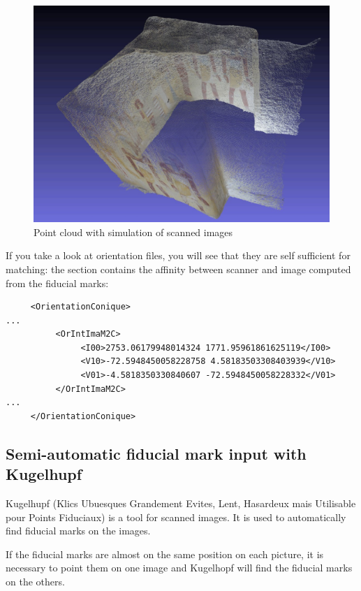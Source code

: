 \begin{figure}
   \includegraphics[width=120mm]{FIGS/Niche/snapshot00.jpg}
\caption{Point cloud with simulation of scanned images}
\label{ImNiche}
\end{figure}


If you take a look at orientation files, you will see that they are self sufficient for
matching: the {\tt <OrIntImaM2C>}  section contains the affinity between scanner and image computed
from the fiducial marks:

\begin{verbatim}
     <OrientationConique>
...
          <OrIntImaM2C>
               <I00>2753.06179948014324 1771.95961861625119</I00>
               <V10>-72.5948450058228758 4.58183503308403939</V10>
               <V01>-4.5818350330840607 -72.5948450058228332</V01>
          </OrIntImaM2C>
...
     </OrientationConique>
\end{verbatim}



\subsection{Semi-automatic fiducial mark input with Kugelhupf}

Kugelhupf (Klics Ubuesques Grandement Evites, Lent, Hasardeux mais Utilisable pour Points Fiduciaux) is a tool for scanned images. It is used to automatically find fiducial marks on the images.

If the fiducial marks are almost on the same position on each picture, it is necessary to point them on one image and Kugelhopf will find the fiducial marks on the others.

